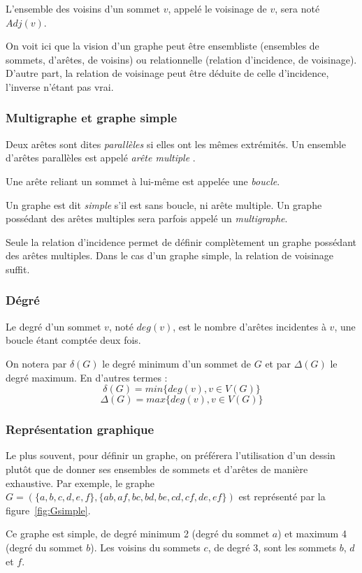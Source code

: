 \documentclass[11pt,a4paper]{report}
\begin{document}
L'ensemble des voisins d'un sommet $v$, appelé le voisinage de $v$, sera noté $Adj(v)$.

On voit ici que la vision d'un graphe peut être ensembliste (ensembles de sommets, d'arêtes, de voisins) ou relationnelle (relation d'incidence, de voisinage). D'autre part, la relation de voisinage peut être déduite de celle d'incidence, l'inverse n'étant pas vrai.

\subsubsection{Multigraphe et graphe simple}

Deux arêtes sont dites {\em parallèles} si elles ont les mêmes extrémités. Un ensemble d'arêtes parallèles est appelé {\em arête multiple} .

Une arête reliant un sommet à lui-même est appelée une {\em boucle}. 

Un graphe est dit {\em simple} s'il est sans boucle, ni arête multiple. Un graphe possédant des arêtes multiples sera parfois appelé un {\em multigraphe}.


Seule la relation d'incidence permet de définir complètement un graphe possédant des arêtes multiples. Dans le cas d'un graphe simple, la relation de voisinage suffit.

\subsubsection{Dégré}

Le degré d'un sommet $v$, noté $deg(v)$, est le nombre d'arêtes incidentes à $v$, une boucle étant comptée deux fois.

On notera par $\delta(G)$ le degré minimum d'un sommet de $G$ et par $\Delta(G)$ le degré maximum. En d'autres termes : 
$$\delta(G) = min\{deg(v), v \in V(G)\}$$
$$\Delta(G) = max\{deg(v), v \in V(G)\}$$

\subsubsection{Représentation graphique}

Le plus souvent, pour définir un graphe, on préférera l'utilisation d'un dessin plutôt que de donner ses ensembles de sommets et d'arêtes de manière exhaustive. Par exemple, le graphe $G = (\{a, b, c, d, e, f\}, \{ab, af, bc, bd, be, cd, cf, de, ef\})$ est représenté par la figure~\ref{fig:Gsimple}. 

Ce graphe est simple, de degré minimum 2 (degré du sommet $a$) et maximum 4 (degré du sommet $b$). Les voisins du sommets $c$, de degré 3, sont les sommets $b$, $d$ et $f$.
\end{document}
